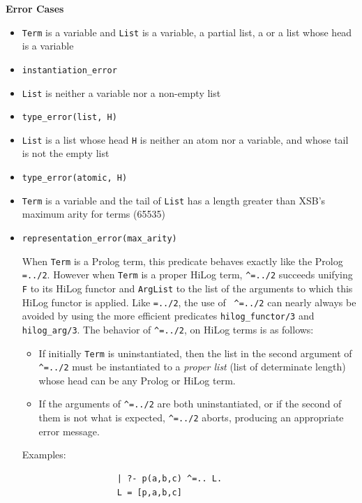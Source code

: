 \begin{description}
{\bf Error Cases}
\begin{itemize}
\item {\tt Term} is a variable and {\tt List} is a variable, a partial list,
a  or a list whose head is a variable
\bi
\item {\tt instantiation\_error}
\ei
\item {\tt List} is neither a variable nor a non-empty list
\bi
\item {\tt type\_error(list, H)}
\ei
\item {\tt List} is a list whose head {\tt H} is neither an atom nor a
  variable, and whose tail is not the empty list 
\bi
\item {\tt type\_error(atomic, H)}
\ei
\item {\tt Term} is a variable and the tail of {\tt List} has a length
  greater than XSB's maximum arity for terms (65535) 
\bi
\item {\tt representation\_error(max\_arity)}
\ei
\ei


When {\tt Term} is a Prolog term, this predicate behaves exactly like
the Prolog {\tt =../2}. However when {\tt Term} is a proper HiLog
term, {\tt \verb|^|=../2} succeeds unifying {\tt F} to its HiLog
functor and {\tt ArgList} to the list of the arguments to which this
HiLog functor is applied. Like {\tt =../2}, the use of {\tt
  \verb|^|=../2} can nearly always be avoided by using the more
efficient predicates {\tt hilog\_functor/3} and {\tt
  hilog\_arg/3}. The behavior of {\tt \verb|^|=../2}, on HiLog terms
is as follows:
    \begin{itemize}
    \item If initially {\tt Term} is uninstantiated, then the list in the 
          second argument of {\tt \verb|^|=../2} must be instantiated to 
          a {\em proper list} (list of determinate length) whose head can 
          be any Prolog or HiLog term.
    \item If the arguments of {\tt \verb|^|=../2} are both uninstantiated, 
          or if the second of them is not what is expected, 
          {\tt \verb|^|=../2} aborts, producing an appropriate error message.
    \end{itemize}
    Examples:
    {\footnotesize
     \begin{verbatim}
                   | ?- p(a,b,c) ^=.. L.
                   L = [p,a,b,c]


\end{verbatim}}
\end{itemize}
\end{description}
